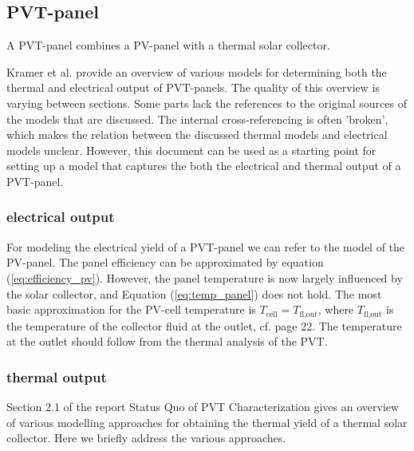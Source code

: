 \subsection{PVT-panel}

A PVT-panel combines a PV-panel with a thermal solar collector. 

Kramer et al. \cite{SHC2020PVT} provide an overview of various models for determining both the thermal and electrical output of PVT-panels. The quality of this overview is varying between sections. Some parts lack the references to the original sources of the models that are discussed. The internal cross-referencing is often 'broken', which makes the relation between the discussed thermal models and electrical models unclear. However, this document can be used as a starting point for setting up a model that captures the both the electrical and thermal output of a PVT-panel.

\subsubsection{electrical output}
For modeling the electrical yield of a PVT-panel we can refer to the model of the PV-panel. The panel efficiency can be approximated by equation (\ref{eq:efficiency_pv}). However, the panel temperature is now largely influenced by the solar collector, and Equation (\ref{eq:temp_panel}) does not hold. The most basic approximation for the PV-cell temperature is $T_{\text{cell}} = T_{\text{fl,out}}$, where $T_{\text{fl,out}} $ is the temperature of the collector fluid at the outlet, cf. \cite{SHC2020PVT} page 22. The temperature at the outlet should follow from the thermal analysis of the PVT.

\subsubsection{thermal output}
Section 2.1 of the report Status Quo of PVT Characterization \cite{SHC2020PVT} gives an overview of various modelling approaches for obtaining the thermal yield of a thermal solar collector.
Here we briefly address the various approaches.

